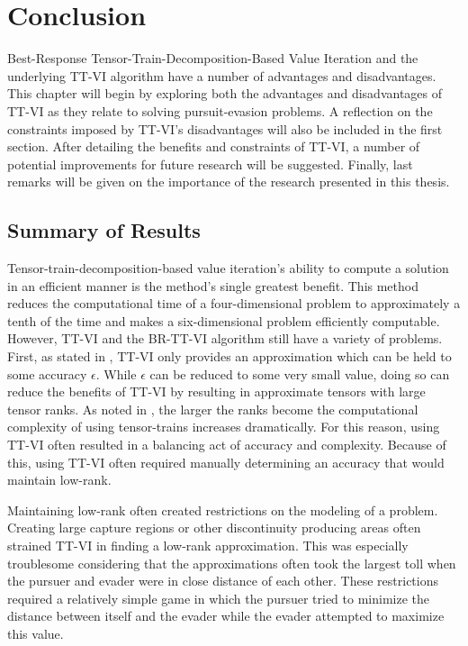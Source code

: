 \chapter{Conclusion}\label{chp:con}
Best-Response Tensor-Train-Decomposition-Based Value Iteration and the underlying TT-VI algorithm have a number of advantages and disadvantages. This chapter will begin by exploring both the advantages and disadvantages of TT-VI as they relate to solving pursuit-evasion problems. A reflection on the constraints imposed by TT-VI's disadvantages will also be included in the first section. After detailing the benefits and constraints of TT-VI, a number of potential improvements for future research will be suggested. Finally, last remarks will be given on the importance of the research presented in this thesis.  

\section{Summary of Results}
Tensor-train-decomposition-based value iteration's ability to compute a solution in an efficient manner is the method's single greatest benefit. This method reduces the computational time of a four-dimensional problem to approximately a tenth of the time and makes a six-dimensional problem efficiently computable. However, TT-VI and the BR-TT-VI algorithm still have a variety of problems. First, as stated in , TT-VI only provides an approximation which can be held to some accuracy $\epsilon$. While $\epsilon$ can be reduced to some very small value, doing so can reduce the benefits of TT-VI by resulting in approximate tensors with large tensor ranks. As noted in , the larger the ranks become the computational complexity of using tensor-trains increases dramatically. For this reason, using TT-VI often resulted in a balancing act of accuracy and complexity. Because of this, using TT-VI often required manually determining an accuracy that would maintain low-rank.

Maintaining low-rank often created restrictions on the modeling of a problem. Creating large capture regions or other discontinuity producing areas often strained TT-VI in finding a low-rank approximation. This was especially troublesome considering that the approximations often took the largest toll when the pursuer and evader were in close distance of each other. These restrictions required a relatively simple game in which the pursuer tried to minimize the distance between itself and the evader while the evader attempted to maximize this value.

